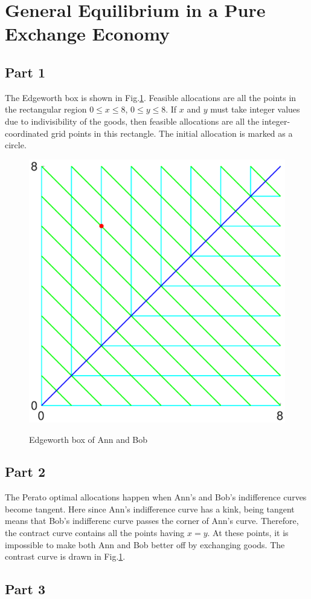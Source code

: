 \documentclass{article}
\begin{document}
\section{General Equilibrium in a Pure Exchange Economy}
\subsection{Part 1}
The Edgeworth box is shown in Fig.\ref{Edgeworth}. Feasible allocations are all the points in the rectangular region $0\leqslant x\leqslant8$, $0\leqslant y\leqslant8$. If $x$ and $y$ must take integer values due to indivisibility of the goods, then feasible allocations are all the integer-coordinated grid points in this rectangle. The initial allocation is marked as a circle.
\begin{figure}[!htbp]
	\centering
	\includegraphics[width=12cm]{figure3.eps}\\
	\caption{Edgeworth box of Ann and Bob}
	\label{Edgeworth}
\end{figure}


\subsection{Part 2}
The Perato optimal allocations happen when Ann's and Bob's indifference curves become tangent. Here since Ann's indifference curve has a kink, being tangent means that Bob's indifferenc curve passes the corner of Ann's curve. Therefore, the contract curve contains all the points having $x=y$. At these points, it is impossible to make both Ann and Bob better off by exchanging goods. The contrast curve is drawn in Fig.\ref{Edgeworth}.

\subsection{Part 3}
\end{document}
